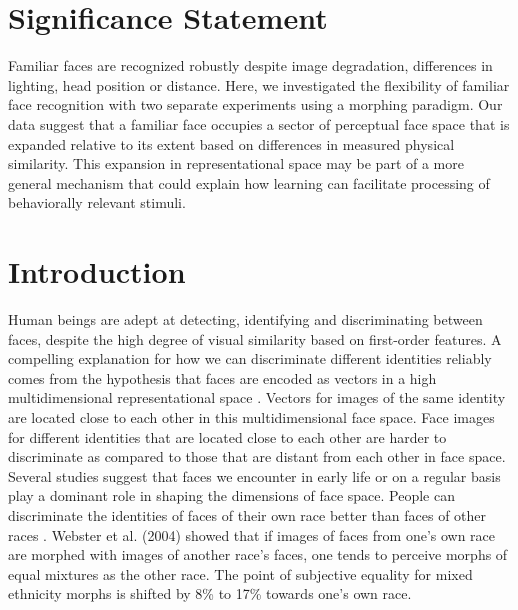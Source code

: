 \documentclass[10pt,letterpaper]{article}
\begin{document}
\section*{Significance Statement}
Familiar faces are recognized robustly despite image degradation, differences in lighting, head position or distance.  Here, we investigated the flexibility of familiar face recognition with two separate experiments using a morphing paradigm. Our data suggest that a familiar face occupies a sector of perceptual face space that is expanded relative to its extent based on differences in measured physical similarity. This expansion in representational space may be part of a more general mechanism that could explain how learning can facilitate processing of behaviorally relevant stimuli.

\linenumbers

\section*{Introduction}
Human beings are adept at detecting, identifying and discriminating between faces, despite the high degree of visual similarity based on first-order features. A compelling explanation for how we can discriminate different identities reliably comes from the hypothesis that faces are encoded as vectors in a high multidimensional representational space \cite{valentine1991unified, lee2000caricature, leopold2001prototype, jiang2007role}. Vectors for images of the same identity are located close to each other in this multidimensional face space.  Face images for different identities that are located close to each other are harder to discriminate as compared to those that are distant from each other in face space.  Several studies suggest that faces we encounter in early life \cite{slater2010shaping} or on a regular basis \cite{o1994structural} play a dominant role in shaping the dimensions of face space.  People can discriminate the identities of faces of their own race better than faces of other races \cite{feingold1914influence, rhodes1989expertise}. Webster et al. (2004) \cite{webster2004adaptation} showed that if images of faces from one’s own race are morphed with images of another race’s faces, one tends to perceive morphs of equal mixtures as the other race.  The point of subjective equality for mixed ethnicity morphs is shifted by 8\% to 17\% towards one’s own race. 
\end{document}
